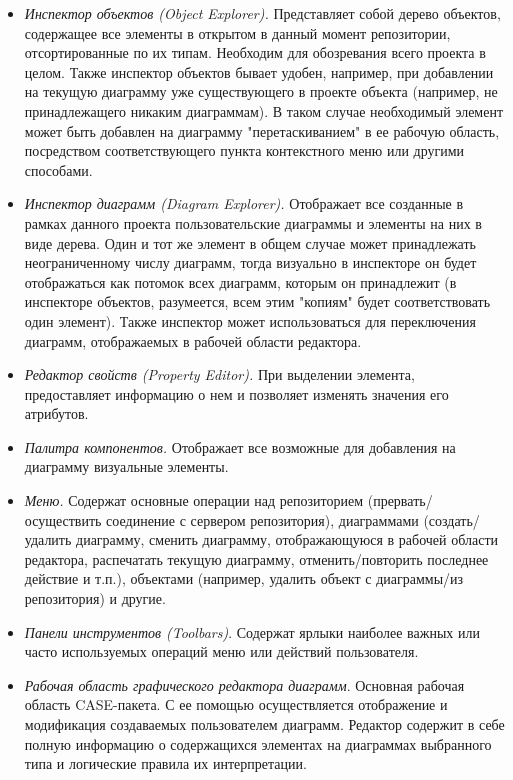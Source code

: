 \documentclass[a5paper]{article}
\begin{document}
\begin{itemize}
  \item \textit{Инспектор объектов (Object Explorer).} Представляет
	собой дерево объектов, содержащее все элементы в открытом в данный
	момент репозитории, отсортированные по их типам. Необходим для
	обозревания всего проекта в целом. Также инспектор объектов бывает
	удобен, например, при добавлении на текущую диаграмму уже существующего
	в проекте объекта (например, не принадлежащего никаким диаграммам). В
	таком случае необходимый элемент может быть добавлен на диаграмму
	"перетаскиванием" в ее рабочую область, посредством соответствующего
	пункта контекстного меню или другими способами.
  \item \textit{Инспектор диаграмм (Diagram Explorer).} Отображает все
	созданные в рамках данного проекта пользовательские диаграммы и
	элементы на них в виде дерева. Один и тот же элемент в общем случае
	может принадлежать неограниченному числу диаграмм, тогда визуально в
	инспекторе он будет отображаться как потомок всех диаграмм, которым он
	принадлежит (в инспекторе объектов, разумеется, всем этим "копиям"
	будет соответствовать один элемент). Также инспектор может
	использоваться для переключения диаграмм, отображаемых в рабочей
	области редактора.
  \item \textit{Редактор свойств (Property Editor).} При выделении
    элемента, предоставляет информацию о нем и позволяет изменять значения
	его атрибутов.
  \item \textit{Палитра компонентов.} Отображает все возможные для добавления на
	диаграмму визуальные элементы. 
  \item \textit{Меню.} Содержат основные операции над репозиторием
	(прервать/осуществить соединение с сервером репозитория), диаграммами
	(создать/удалить диаграмму, сменить диаграмму, отображающуюся в рабочей
	области редактора, распечатать текущую диаграмму, отменить/повторить
	последнее действие и т.п.), объектами (например, удалить объект с
	диаграммы/из репозитория) и другие.
  \item \textit{Панели инструментов (Toolbars)}. Содержат
	ярлыки наиболее важных или часто используемых операций меню или
	действий пользователя.
  \item \textit{Рабочая область графического редактора диаграмм}. Основная
	рабочая область CASE-пакета. С ее помощью
	осуществляется отображение и модификация создаваемых пользователем
	диаграмм. Редактор содержит в себе полную информацию о содержащихся
	элементах на диаграммах выбранного типа и логические правила их
	интерпретации.
\end{itemize}
\end{document}
